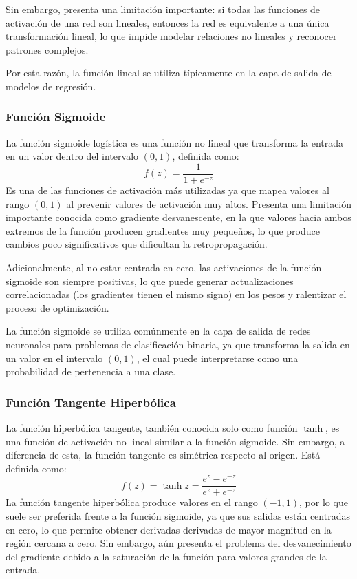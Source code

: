 Sin embargo, presenta una limitación importante: si todas las funciones de activación de 
una red son lineales, entonces la red es equivalente a una única transformación lineal, 
lo que impide modelar relaciones no lineales y reconocer patrones complejos.

Por esta razón, la función lineal se utiliza típicamente en la capa de salida de modelos 
de regresión.

\subsubsection{Función Sigmoide}
La función sigmoide logística es una función no lineal que transforma la entrada en un valor
dentro del intervalo $(0,1)$, definida como:
\begin{equation}
    f(z)=\frac{1}{1+e^{-z}}
\end{equation}
Es una de las funciones de activación más utilizadas ya que mapea valores al rango $(0,1)$
al prevenir valores de activación muy altos. Presenta una limitación importante conocida
como \guillemotleft gradiente desvanescente\guillemotright, en la que valores hacia ambos
extremos de la función producen gradientes muy pequeños, lo que produce cambios poco significativos
que dificultan la retropropagación.
\medskip

Adicionalmente, al no estar centrada en cero, las activaciones de la función sigmoide 
son siempre positivas, lo que puede generar actualizaciones correlacionadas (los gradientes
tienen el mismo signo) en los pesos y ralentizar el proceso de optimización.
\medskip

La función sigmoide se utiliza comúnmente en la capa de salida de redes neuronales
para problemas de clasificación binaria, ya que transforma la salida en un valor
en el intervalo $(0,1)$, el cual puede interpretarse como una probabilidad de
pertenencia a una clase.

\subsubsection{Función Tangente Hiperbólica}
La función hiperbólica tangente, también conocida solo como función $\tanh$, es una
función de activación no lineal similar a la función sigmoide. 
Sin embargo, a diferencia de esta, la función tangente es simétrica respecto al origen.
Está definida como:
\begin{equation}
    f(z) = \tanh{z} = \frac{e^{z}-e^{-z}}{e^{z}+e^{-z}}
\end{equation}
La función tangente hiperbólica produce valores en el rango $(-1,1)$, por lo que suele ser
preferida frente a la función sigmoide, ya que sus salidas están centradas en
cero, lo que permite obtener derivadas derivadas de mayor magnitud en la región cercana 
a cero.
Sin embargo, aún presenta el problema del desvanecimiento del gradiente debido a la
saturación de la función para valores grandes de la entrada.

